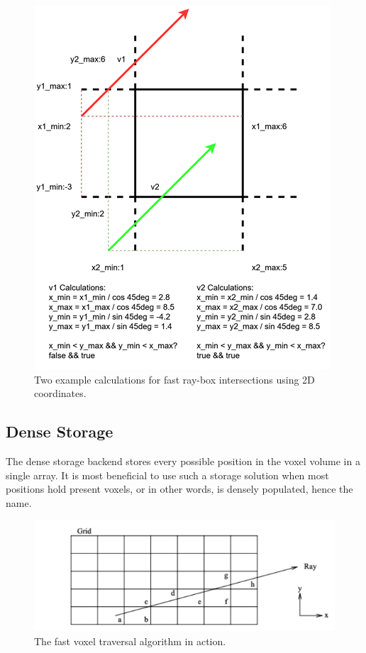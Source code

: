 \documentclass[conference]{IEEEtran}
\begin{document}
\begin{figure}[htbp]
\centerline{\includegraphics[width=\linewidth]{fast-intersection}}
\caption{Two example calculations for fast ray-box intersections using 2D coordinates.}
\label{fast-intersection}
\end{figure}

\subsection{Dense Storage}

The dense storage backend stores every possible position in the voxel volume in a single array.
It is most beneficial to use such a storage solution when most positions hold present voxels, or in other words, is densely populated, hence the name.

\begin{figure}[htbp]
\centerline{\includegraphics[width=\linewidth]{fast-traversal}}
\caption{The fast voxel traversal algorithm in action.}
\label{fast-traversal}
\end{figure}
\end{document}
